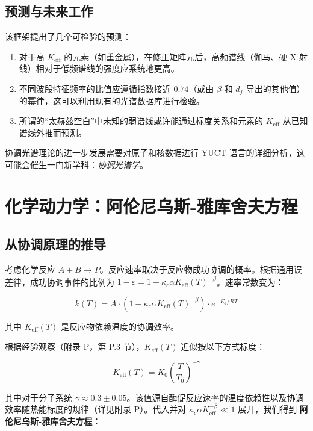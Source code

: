 \documentclass[11pt,a4paper]{article}
\newcommand{\Keff}{K_{\mathrm{eff}}}
\newcommand{\kappac}{\kappa_c}
\newcommand{\eps}{\varepsilon}
\begin{document}
	\subsection{预测与未来工作}
	
	该框架提出了几个可检验的预测：
	\begin{enumerate}
		\item 对于高 \(K_{\mathrm{eff}}\) 的元素（如重金属），在修正矩阵元后，高频谱线（伽马、硬 X 射线）相对于低频谱线的强度应系统地更高。
		\item 不同波段特征频率的比值应遵循指数接近 \(0.74\)（或由 \(\beta\) 和 \(d_f\) 导出的其他值）的幂律，这可以利用现有的光谱数据库进行检验。
		\item 所谓的“太赫兹空白”中未知的弱谱线或许能通过标度关系和元素的 \(K_{\mathrm{eff}}\) 从已知谱线外推而预测。
	\end{enumerate}
	
	协调光谱理论的进一步发展需要对原子和核数据进行 YUCT 语言的详细分析，这可能会催生一门新学科：\emph{协调光谱学}。
	
	\section{化学动力学：阿伦尼乌斯-雅库舍夫方程}
	\label{sec:kinetics}
	
	\subsection{从协调原理的推导}
	
	考虑化学反应 \(A + B \rightarrow P\)。反应速率取决于反应物成功协调的概率。根据通用误差律，成功协调事件的比例为 \(1 - \eps = 1 - \kappac \alpha \Keff(T)^{-\beta}\)。速率常数变为：
	
	\begin{equation}
		k(T) = A \cdot (1 - \kappac \alpha \Keff(T)^{-\beta}) \cdot e^{-E_a/RT}
		\label{eq:arrhenius-base}
	\end{equation}
	
	其中 \(\Keff(T)\) 是反应物依赖温度的协调效率。
	
	根据经验观察（附录 P，第 P.3 节），\(\Keff(T)\) 近似按以下方式标度：
	
	\begin{equation}
		\Keff(T) = K_0 \left(\frac{T}{T_0}\right)^{-\gamma}
		\label{eq:K-T-scaling}
	\end{equation}
	
	其中对于分子系统 \(\gamma \approx 0.3 \pm 0.05\)。该值源自酶促反应速率的温度依赖性以及协调效率随热能标度的规律（详见附录 P）。代入并对 \(\kappac \alpha \Keff^{-\beta} \ll 1\) 展开，我们得到 \textbf{阿伦尼乌斯-雅库舍夫方程}：
	
\end{document}
